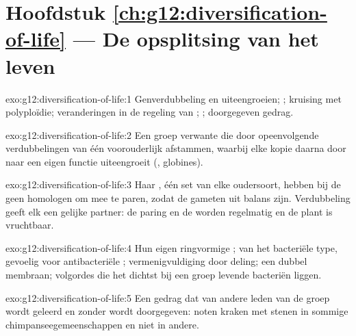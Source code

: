 \section*{Hoofdstuk \ref{ch:g12:diversification-of-life} --- De opsplitsing van het leven}

\begin{solution}{exo:g12:diversification-of-life:1}
Genverdubbeling en uiteengroeien; ; kruising met
polyploïdie; veranderingen in de regeling van ;
; doorgegeven gedrag.
\end{solution}

\begin{solution}{exo:g12:diversification-of-life:2}
Een groep verwante  die door opeenvolgende verdubbelingen van één
voorouderlijk  afstammen, waarbij elke kopie daarna door  naar
een eigen functie uiteengroeit (, globines).
\end{solution}

\begin{solution}{exo:g12:diversification-of-life:3}
Haar , één set van elke oudersoort, hebben bij de  geen
homologen om mee te paren, zodat de gameten uit balans zijn. Verdubbeling
geeft elk  een gelijke partner: de paring en de  worden
regelmatig en de plant is vruchtbaar.
\end{solution}

\begin{solution}{exo:g12:diversification-of-life:4}
Hun eigen ringvormige ;  van het bacteriële type, gevoelig
voor antibacteriële ; vermenigvuldiging door deling; een dubbel
membraan; volgordes die het dichtst bij een groep levende bacteriën
liggen.
\end{solution}

\begin{solution}{exo:g12:diversification-of-life:5}
Een gedrag dat van andere leden van de groep wordt geleerd en zonder 
wordt doorgegeven: noten kraken met stenen in sommige
chimpanseegemeenschappen en niet in andere.
\end{solution}

